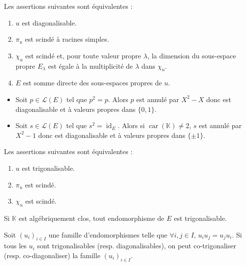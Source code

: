 
	\begin{theorem}
		Les assertions suivantes sont équivalentes :
		\begin{enumerate}[label=(\roman*)]
			\item $u$ est diagonalisable.
			\item $\pi_u$ est scindé à racines simples.
			\item $\chi_u$ est scindé et, pour toute valeur propre $\lambda$, la dimension du sous-espace propre $E_\lambda$ est égale à la multiplicité de $\lambda$ dans $\chi_u$.
			\item $E$ est somme directe des sous-espaces propres de $u$.
		\end{enumerate}
	\end{theorem}

	\begin{example}
		\begin{itemize}
			\item Soit $p \in \mathcal{L}(E)$ tel que $p^2 = p$. Alors $p$ est annulé par $X^2 - X$ donc est diagonalisable et à valeurs propres dans $\{ 0, 1 \}$.
			\item Soit $s \in \mathcal{L}(E)$ tel que $s^2 = \operatorname{id}_E$. Alors si $\operatorname{car}(\mathbb{K}) \neq 2$, $s$ est annulé par $X^2 - 1$ donc est diagonalisable et à valeurs propres dans $\{ \pm 1 \}$.
		\end{itemize}
	\end{example}

	\begin{theorem}
		Les assertions suivantes sont équivalentes :
		\begin{enumerate}[label=(\roman*)]
			\item $u$ est trigonalisable.
			\item $\pi_u$ est scindé.
			\item $\chi_u$ est scindé.
		\end{enumerate}
	\end{theorem}

	\begin{example}
		Si $\mathbb{K}$ est algébriquement clos, tout endomorphisme de $E$ est trigonalisable.
	\end{example}

	\begin{theorem}
		\label{151-1}
		Soit $(u_i)_{i \in I}$ une famille d'endomorphismes telle que $\forall i, j \in I, \, u_i u_j = u_j u_i$. Si tous les $u_i$ sont trigonalisables (resp. diagonalisables), on peut co-trigonaliser (resp. co-diagonaliser) la famille $(u_i)_{i \in I}$.
	\end{theorem}


